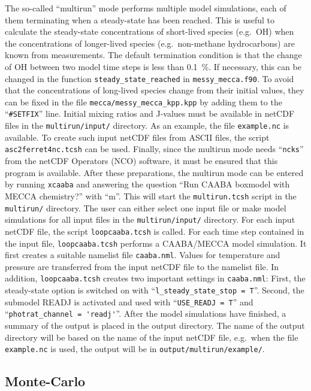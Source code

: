 \documentclass[twoside]{article}
\begin{document}
The so-called ``multirun'' mode performs multiple model simulations,
each of them terminating when a steady-state has been reached. This is
useful to calculate the steady-state concentrations of short-lived
species (e.g.\ OH) when the concentrations of longer-lived species
(e.g.\ non-methane hydrocarbons) are known from measurements. The
default termination condition is that the change of OH between two model
time steps is less than 0.1~\unit{\%}. If necessary, this can be changed
in the function \verb|steady_state_reached| in \verb|messy_mecca.f90|.
To avoid that the concentrations of long-lived species change from their
initial values, they can be fixed in the file
\verb|mecca/messy_mecca_kpp.kpp| by adding them to the
``\verb|#SETFIX|'' line. Initial mixing ratios and J-values must be
available in netCDF files in the \verb|multirun/input/| directory. As an
example, the file \verb|example.nc| is available. To create such input
netCDF files from ASCII files, the script \verb|asc2ferret4nc.tcsh| can
be used. Finally, since the multirun mode needs ``\verb|ncks|'' from the
netCDF Operators (NCO) software, it must be ensured that this program is
available. After these preparations, the multirun mode can be entered by
running \verb|xcaaba| and answering the question ``Run CAABA boxmodel
with MECCA chemistry?'' with ``m''. This will start the
\verb|multirun.tcsh| script in the \verb|multirun/| directory. The user
can either select one input file or make model simulations for all input
files in the \verb|multirun/input/| directory. For each input netCDF
file, the script \verb|loopcaaba.tcsh| is called. For each time step
contained in the input file, \verb|loopcaaba.tcsh| performs a
CAABA/MECCA model simulation. It first creates a suitable namelist file
\verb|caaba.nml|. Values for temperature and pressure are transferred
from the input netCDF file to the namelist file. In addition,
\verb|loopcaaba.tcsh| creates two important settings in
\verb|caaba.nml|: First, the steady-state option is switched on with
``\verb|l_steady_state_stop = T|''. Second, the submodel READJ is
activated and used with ``\verb|USE_READJ = T|'' and
``\verb|photrat_channel = 'readj'|''. After the model simulations have
finished, a summary of the output is placed in the output directory. The
name of the output directory will be based on the name of the input
netCDF file, e.g.\ when the file \verb|example.nc| is used, the output
will be in \verb|output/multirun/example/|.

\subsection{Monte-Carlo}
\label{sec:montecarlo}
\end{document}
